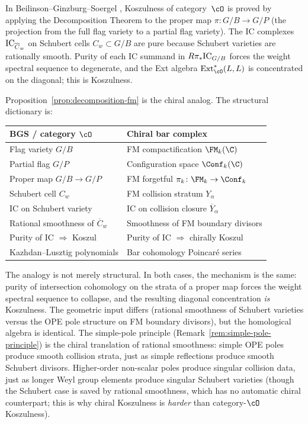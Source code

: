 \begin{remark}
\label{rem:bgs-parallel}
In Beilinson--Ginzburg--Soergel \cite{BGS96}, Koszulness of
category~$\cO$ is proved by applying the Decomposition Theorem to
the proper map $\pi\colon G/B \to G/P$ (the projection from the
full flag variety to a partial flag variety). The IC complexes
$\mathrm{IC}_{\overline{C}_w}$ on Schubert cells $C_w \subset G/B$ are
pure because Schubert varieties are rationally smooth. Purity of
each IC summand in $R\pi_*\mathrm{IC}_{G/B}$ forces the weight spectral
sequence to degenerate, and the Ext algebra
$\mathrm{Ext}^*_{\cO}(L, L)$ is concentrated on the diagonal; this
is Koszulness.

Proposition~\ref{prop:decomposition-fm} is the chiral analog.
The structural dictionary is:

\begin{center}
\renewcommand{\arraystretch}{1.3}
\begin{tabular}{@{}ll@{}}
\toprule
\textbf{BGS / category $\cO$} & \textbf{Chiral bar complex} \\
\midrule
Flag variety $G/B$ & FM compactification $\FM_k(\C)$ \\
Partial flag $G/P$ & Configuration space $\Conf_k(\C)$ \\
Proper map $G/B \to G/P$ & FM forgetful $\pi_k\colon \FM_k \to \Conf_k$ \\
Schubert cell $C_w$ & FM collision stratum $Y_\alpha$ \\
IC on Schubert variety & IC on collision closure $\overline{Y}_\alpha$ \\
Rational smoothness of $\overline{C}_w$ & Smoothness of FM boundary divisors \\
Purity of IC $\Rightarrow$ Koszul & Purity of IC $\Rightarrow$ chirally Koszul \\
Kazhdan--Lusztig polynomials & Bar cohomology Poincaré series \\
\bottomrule
\end{tabular}
\end{center}

The analogy is not merely structural. In both cases, the mechanism
is the same: purity of intersection cohomology on the strata of a
proper map forces the weight spectral sequence to collapse, and the
resulting diagonal concentration \emph{is} Koszulness. The
geometric input differs (rational smoothness of Schubert varieties
versus the OPE pole structure on FM boundary divisors), but the
homological algebra is identical. The simple-pole principle
(Remark~\ref{rem:simple-pole-principle}) is the chiral translation
of rational smoothness: simple OPE poles produce smooth collision
strata, just as simple reflections produce smooth Schubert divisors.
Higher-order non-scalar poles produce singular collision data, just
as longer Weyl group elements produce singular Schubert varieties
(though the Schubert case is saved by rational smoothness, which has
no automatic chiral counterpart; this is why chiral Koszulness is
\emph{harder} than category-$\cO$ Koszulness).
\end{remark}

